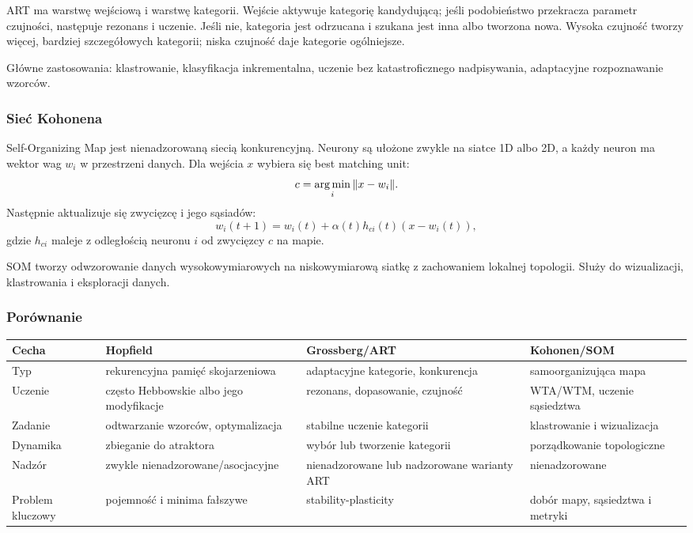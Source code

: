 ART ma warstwę wejściową i warstwę kategorii. Wejście aktywuje kategorię kandydującą; jeśli podobieństwo przekracza parametr czujności, następuje rezonans i uczenie. Jeśli nie, kategoria jest odrzucana i szukana jest inna albo tworzona nowa. Wysoka czujność tworzy więcej, bardziej szczegółowych kategorii; niska czujność daje kategorie ogólniejsze.

Główne zastosowania: klastrowanie, klasyfikacja inkrementalna, uczenie bez katastroficznego nadpisywania, adaptacyjne rozpoznawanie wzorców.

\subsubsection{Sieć Kohonena}

Self-Organizing Map jest nienadzorowaną siecią konkurencyjną. Neurony są ułożone zwykle na siatce 1D albo 2D, a każdy neuron ma wektor wag $w_i$ w przestrzeni danych. Dla wejścia $x$ wybiera się best matching unit:
\[
c=\operatorname*{arg\,min}_i\|x-w_i\|.
\]
Następnie aktualizuje się zwycięzcę i jego sąsiadów:
\[
w_i(t+1)=w_i(t)+\alpha(t)h_{ci}(t)(x-w_i(t)),
\]
gdzie $h_{ci}$ maleje z odległością neuronu $i$ od zwycięzcy $c$ na mapie.

SOM tworzy odwzorowanie danych wysokowymiarowych na niskowymiarową siatkę z zachowaniem lokalnej topologii. Służy do wizualizacji, klastrowania i eksploracji danych.

\subsubsection{Porównanie}

\begin{longtable}{p{}p{}p{}p{}}
\toprule
Cecha & Hopfield & Grossberg/ART & Kohonen/SOM \\
\midrule
Typ & rekurencyjna pamięć skojarzeniowa & adaptacyjne kategorie, konkurencja & samoorganizująca mapa \\
Uczenie & często Hebbowskie albo jego modyfikacje & rezonans, dopasowanie, czujność & WTA/WTM, uczenie sąsiedztwa \\
Zadanie & odtwarzanie wzorców, optymalizacja & stabilne uczenie kategorii & klastrowanie i wizualizacja \\
Dynamika & zbieganie do atraktora & wybór lub tworzenie kategorii & porządkowanie topologiczne \\
Nadzór & zwykle nienadzorowane/asocjacyjne & nienadzorowane lub nadzorowane warianty ART & nienadzorowane \\
Problem kluczowy & pojemność i minima fałszywe & stability-plasticity & dobór mapy, sąsiedztwa i metryki \\
\bottomrule
\end{longtable}

